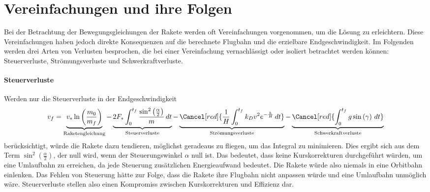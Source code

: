 %
%
%
%

\section{Vereinfachungen und ihre Folgen 
	\label{leo:section:vereinfachungen}}

Bei der Betrachtung der Bewegungsgleichungen der Rakete werden oft Vereinfachungen vorgenommen, um die Lösung zu erleichtern. 
Diese Vereinfachungen haben jedoch direkte Konsequenzen auf die berechnete Flugbahn und die erzielbare Endgeschwindigkeit. 
Im Folgenden werden drei Arten von Verlusten besprochen, die bei einer Vereinfachung vernachlässigt oder isoliert betrachtet werden können: Steuerverluste, Strömungsverluste und Schwerkraftverluste.


\paragraph{Steuerverluste} Werden nur die Steuerverluste in der Endgeschwindigkeit
\begin{equation*}
	v_f = \underbrace{v_* \ln \left(\frac{m_0}{m_f}\right)}_{\text{Raketengleichung}} 
	- \underbrace{2F_* \int_0^{t_f} \frac{\sin^2\left(\frac{\alpha}{2}\right)}{m} \, dt }_{\text{Steuerverluste}}
	- \underbrace{\Cancel[red]{\frac{1}{H} \int_0^{t_f} k_Dv^2 e^{-\frac{h}{H}} \, dt }}_{\text{Strömungsverluste}}
	- \underbrace{\Cancel[red]{\int_0^{t_f} g \sin \left(\gamma\right) \, dt}}_{\text{Schwerkraftverluste}}
\end{equation*}
berücksichtigt, würde die Rakete dazu tendieren, möglichst geradeaus zu fliegen, um das Integral zu minimieren. 
Dies ergibt sich aus dem Term $\sin^2\left( \frac{\alpha}{2}\right)$, der null wird, wenn der Steuerungswinkel $\alpha$ null ist. 
Das bedeutet, dass keine Kurskorrekturen durchgeführt würden, um eine Umlaufbahn zu erreichen, da jede Steuerung zusätzlichen Energieaufwand bedeutet. 
Die Rakete würde also niemals in eine Orbitbahn einlenken.
Das Fehlen von Steuerung hätte zur Folge, dass die Rakete ihre Flugbahn nicht anpassen würde und eine Umlaufbahn unmöglich wäre. 
Steuerverluste stellen also einen Kompromiss zwischen Kurskorrekturen und Effizienz dar.


